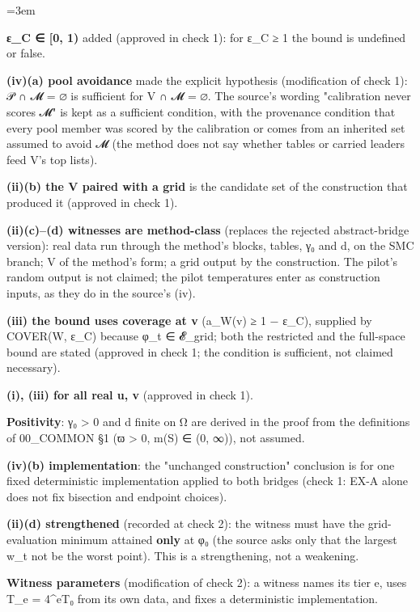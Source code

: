 \documentclass[11pt]{report}
\newcommand{\mdlbl}[1]{\textup{#1}}
\newenvironment{mdblock}{\begingroup\mdfont\raggedright\setlength{\parindent}{0pt}\setlength{\parskip}{0.55em}\emergencystretch=3em}{\par\endgroup}
\begin{document}
\begin{mdblock}
\begin{mdnum}
\item[\mdlbl{1.}] \textbf{ε\_C ∈ [0, 1)} added (approved in check 1): for ε\_C ≥ 1 the bound is undefined or false.
\item[\mdlbl{2.}] \textbf{(iv)(a) pool avoidance} made the explicit hypothesis (modification of check 1): 𝒫 ∩ 𝓜 = ∅ is sufficient for V ∩ 𝓜 = ∅. The source's wording "calibration never scores 𝓜" is kept as a sufficient condition, with the provenance condition that every pool member was scored by the calibration or comes from an inherited set assumed to avoid 𝓜 (the method does not say whether tables or carried leaders feed V's top lists).
\item[\mdlbl{3.}] \textbf{(ii)(b) the V paired with a grid} is the candidate set of the construction that produced it (approved in check 1).
\item[\mdlbl{4.}] \textbf{(ii)(c)–(d) witnesses are method-class} (replaces the rejected abstract-bridge version): real data run through the method's blocks, tables, γ₀ and d, on the SMC branch; V of the method's form; a grid output by the construction. The pilot's random output is not claimed; the pilot temperatures enter as construction inputs, as they do in the source's (iv).
\item[\mdlbl{5.}] \textbf{(iii) the bound uses coverage at v} (a\_W(v) ≥ 1 − ε\_C), supplied by COVER(W, ε\_C) because φ\_t ∈ 𝓔\_grid; both the restricted and the full-space bound are stated (approved in check 1; the condition is sufficient, not claimed necessary).
\item[\mdlbl{6.}] \textbf{(i), (iii) for all real u, v} (approved in check 1).
\item[\mdlbl{7.}] \textbf{Positivity}: γ₀ > 0 and d finite on Ω are derived in the proof from the definitions of 00\_COMMON §1 (ϖ > 0, m(S) ∈ (0, ∞)), not assumed.
\item[\mdlbl{8.}] \textbf{(iv)(b) implementation}: the "unchanged construction" conclusion is for one fixed deterministic implementation applied to both bridges (check 1: EX-A alone does not fix bisection and endpoint choices).
\item[\mdlbl{9.}] \textbf{(ii)(d) strengthened} (recorded at check 2): the witness must have the grid-evaluation minimum attained \textbf{only} at φ₀ (the source asks only that the largest w\_t not be the worst point). This is a strengthening, not a weakening.
\item[\mdlbl{10.}] \textbf{Witness parameters} (modification of check 2): a witness names its tier e, uses T\_e = 4\textasciicircum{}eT₀ from its own data, and fixes a deterministic implementation.
\end{mdnum}
\end{mdblock}
\end{document}
